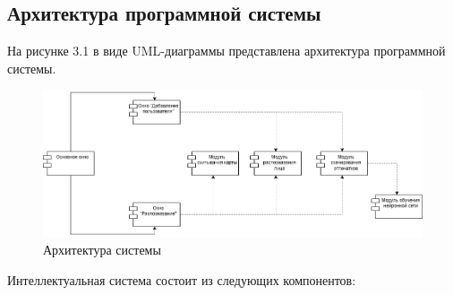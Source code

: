 \subsection{Архитектура программной системы}

На рисунке 3.1 в виде UML-диаграммы представлена архитектура программной системы.

\begin{figure}[H]
	\centering
	\includegraphics[width=0.7\linewidth]{images/diagramUML}
	\caption{Архитектура системы}
	\label{fig:diagramuml}
\end{figure}

Интеллектуальная система состоит из следующих компонентов:

